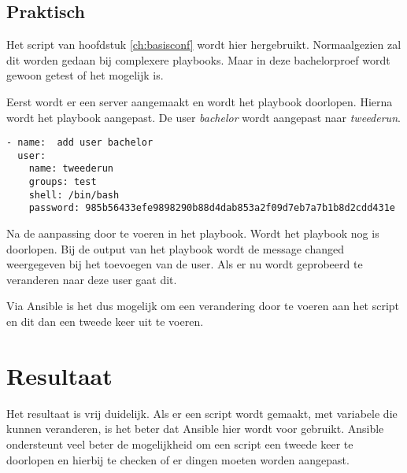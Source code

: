 \subsection{Praktisch}

Het script van hoofdstuk \ref*{ch:basisconf} wordt hier hergebruikt. Normaalgezien zal dit worden gedaan bij complexere playbooks. Maar in deze bachelorproef wordt gewoon getest of het mogelijk is.

Eerst wordt er een server aangemaakt en wordt het playbook doorlopen. Hierna wordt het playbook aangepast. De user \textit{bachelor} wordt aangepast naar \textit{tweederun}.
\begin{lstlisting}
- name:  add user bachelor
  user:
    name: tweederun
    groups: test
    shell: /bin/bash
    password: 985b56433efe9898290b88d4dab853a2f09d7eb7a7b1b8d2cdd431e
\end{lstlisting}

Na de aanpassing door te voeren in het playbook. Wordt het playbook nog is doorlopen. Bij de output van het playbook wordt de message changed weergegeven bij het toevoegen van de user. Als er nu wordt geprobeerd te veranderen naar deze user gaat dit.

Via Ansible is het dus mogelijk om een verandering door te voeren aan het script en dit dan een tweede keer uit te voeren.

\section{Resultaat}
Het resultaat is vrij duidelijk. Als er een script wordt gemaakt, met variabele die kunnen veranderen, is het beter dat Ansible hier wordt voor gebruikt. Ansible ondersteunt veel beter de mogelijkheid om een script een tweede keer te doorlopen en hierbij te checken of er dingen moeten worden aangepast.


